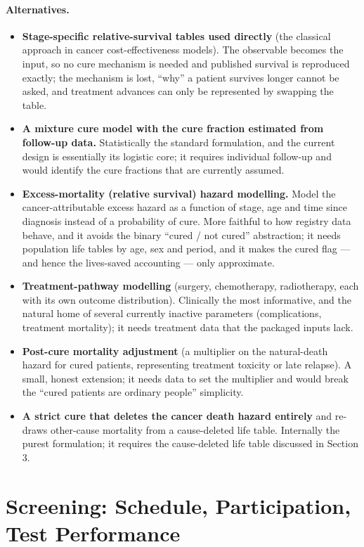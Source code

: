 \documentclass[12pt,a4paper]{article}
\newcommand{\alt}[1]{\paragraph{Alternatives.} #1}
\begin{document}
\alt{\begin{itemize}[nosep]
  \item \textbf{Stage-specific relative-survival tables used directly} (the classical approach in cancer
        cost-effectiveness models). The observable becomes the input, so no cure mechanism is needed and
        published survival is reproduced exactly; the mechanism is lost, ``why'' a patient survives longer
        cannot be asked, and treatment advances can only be represented by swapping the table.
  \item \textbf{A mixture cure model with the cure fraction estimated from follow-up data.} Statistically
        the standard formulation, and the current design is essentially its logistic core; it requires
        individual follow-up and would identify the cure fractions that are currently assumed.
  \item \textbf{Excess-mortality (relative survival) hazard modelling.} Model the cancer-attributable
        excess hazard as a function of stage, age and time since diagnosis instead of a probability of
        cure. More faithful to how registry data behave, and it avoids the binary ``cured / not cured''
        abstraction; it needs population life tables by age, sex and period, and it makes the cured flag
        --- and hence the lives-saved accounting --- only approximate.
  \item \textbf{Treatment-pathway modelling} (surgery, chemotherapy, radiotherapy, each with its own
        outcome distribution). Clinically the most informative, and the natural home of several currently
        inactive parameters (complications, treatment mortality); it needs treatment data that the
        packaged inputs lack.
  \item \textbf{Post-cure mortality adjustment} (a multiplier on the natural-death hazard for cured
        patients, representing treatment toxicity or late relapse). A small, honest extension; it needs
        data to set the multiplier and would break the ``cured patients are ordinary people'' simplicity.
  \item \textbf{A strict cure that deletes the cancer death hazard entirely} and re-draws other-cause
        mortality from a cause-deleted life table. Internally the purest formulation; it requires the
        cause-deleted life table discussed in Section 3.
\end{itemize}}

\section{Screening: Schedule, Participation, Test Performance}
\end{document}
